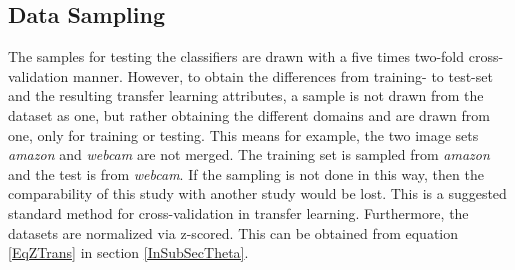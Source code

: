 \subsection{Data Sampling}\label{EmSubSecDataS}
The samples for testing the classifiers are drawn with a five times two-fold cross-validation manner.
However, to obtain the differences from training- to test-set and the resulting transfer learning attributes, a sample is not drawn from the dataset as one, but rather obtaining the different domains and are drawn from one, only for training or testing.
This means for example, the two image sets \textit{amazon} and \textit{webcam} are not merged.
The training set is sampled from \textit{amazon} and the test is from \textit{webcam}.
If the sampling is not done in this way, then the comparability of this study with another study would be lost.
This is a suggested standard method for cross-validation in transfer learning.\cite{Gong.}
Furthermore, the datasets are normalized via z-scored.
This can be obtained from equation \ref{EqZTrans} in section \ref{InSubSecTheta}.
